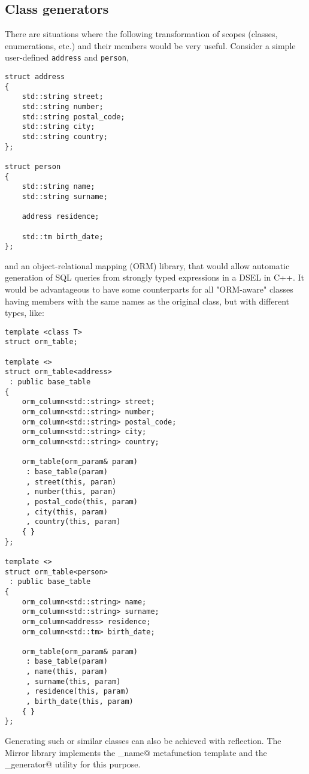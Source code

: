 \subsection{Class generators}
\label{class-generators}

There are situations where the following transformation of
scopes (classes, enumerations, etc.) and their members would be very useful.
Consider a simple user-defined \verb@struct@s
\verb|address| and \verb|person|,

\begin{lstlisting}
struct address
{
	std::string street;
	std::string number;
	std::string postal_code;
	std::string city;
	std::string country;
};

struct person
{
	std::string name;
	std::string surname;

	address residence;

	std::tm birth_date;
};
\end{lstlisting}

and an object-relational mapping (ORM)
library, that would allow automatic generation of SQL queries
from strongly typed expressions in a DSEL in C++. It would
be advantageous to have some counterparts for all "ORM-aware"
classes having members with the same names as the original
class, but with different types, like:

\begin{lstlisting}
template <class T>
struct orm_table;

template <>
struct orm_table<address>
 : public base_table
{
	orm_column<std::string> street;
	orm_column<std::string> number;
	orm_column<std::string> postal_code;
	orm_column<std::string> city;
	orm_column<std::string> country;

	orm_table(orm_param& param)
	 : base_table(param)
	 , street(this, param)
	 , number(this, param)
	 , postal_code(this, param)
	 , city(this, param)
	 , country(this, param)
	{ }
};

template <>
struct orm_table<person>
 : public base_table
{
	orm_column<std::string> name;
	orm_column<std::string> surname;
	orm_column<address> residence;
	orm_column<std::tm> birth_date;

	orm_table(orm_param& param)
	 : base_table(param)
	 , name(this, param)
	 , surname(this, param)
	 , residence(this, param)
	 , birth_date(this, param)
	{ }
};
\end{lstlisting}

Generating such or similar classes can also be achieved with reflection.
The Mirror library implements the \verb@by_name@ metafunction template
and the \verb@class_generator@ utility for this purpose.

